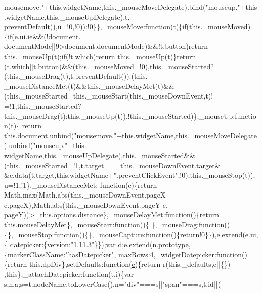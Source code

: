 \begin{DoxyCode}
{      mousemove."}+this.widgetName,this.\_mouseMoveDelegate).bind(\textcolor{stringliteral}{"mouseup."}+this.widgetName,this.\_mouseUpDelegate),t.
      preventDefault(),u=!0,!0)):!0\}\},\_mouseMove:\textcolor{keyword}{function}(\hyperlink{jquery-2_80_83_8min_8js_aaccc9105df5383111407fd5b41255e23}{t})\{\textcolor{keywordflow}{if}(this.\_mouseMoved)\{\textcolor{keywordflow}{if}(e.ui.ie&&(!document.
      documentMode||9>document.documentMode)&&!t.button)\textcolor{keywordflow}{return} this.\_mouseUp(t);\textcolor{keywordflow}{if}(!t.which)\textcolor{keywordflow}{return} this.\_mouseUp(t)\}\textcolor{keywordflow}{return}
      (t.which||t.button)&&(this.\_mouseMoved=!0),this.\_mouseStarted?(this.\_mouseDrag(t),t.preventDefault()):(this.
      \_mouseDistanceMet(t)&&this.\_mouseDelayMet(t)&&(this.\_mouseStarted=this.\_mouseStart(this.\_mouseDownEvent,t)!=
      =!1,this.\_mouseStarted?this.\_mouseDrag(t):this.\_mouseUp(t)),!this.\_mouseStarted)\},\_mouseUp:function(t)\{\textcolor{keywordflow}{
      return} this.document.unbind(\textcolor{stringliteral}{"mousemove."}+this.widgetName,this.\_mouseMoveDelegate).unbind(\textcolor{stringliteral}{"mouseup."}+this.
      widgetName,this.\_mouseUpDelegate),this.\_mouseStarted&&(this.\_mouseStarted=!1,t.target===this.\_mouseDownEvent.target&
      &e.data(t.target,\textcolor{keyword}{this}.widgetName+\textcolor{stringliteral}{".preventClickEvent"},!0),this.\_mouseStop(t)),u=!1,!1\},\_mouseDistanceMet:\textcolor{keyword}{
      function}(e)\{\textcolor{keywordflow}{return} Math.max(Math.abs(\textcolor{keyword}{this}.\_mouseDownEvent.pageX-e.pageX),Math.abs(this.\_mouseDownEvent.pageY-e.
      pageY))>=this.options.distance\},\_mouseDelayMet:\textcolor{keyword}{function}()\{\textcolor{keywordflow}{return} this.mouseDelayMet\},\_mouseStart:\textcolor{keyword}{function}()\{
      \},\_mouseDrag:\textcolor{keyword}{function}()\{\},\_mouseStop:\textcolor{keyword}{function}()\{\},\_mouseCapture:\textcolor{keyword}{function}()\{\textcolor{keywordflow}{return}!0\}\}),e.extend(e.ui,\{
      \hyperlink{date_picker-past_8js_afe491f8c157538f849b1eb001c6477d7}{datepicker}:\{version:\textcolor{stringliteral}{"1.11.3"}\}\});var d;e.extend(n.prototype,\{markerClassName:\textcolor{stringliteral}{"hasDatepicker"},
      maxRows:4,\_widgetDatepicker:\textcolor{keyword}{function}()\{\textcolor{keywordflow}{return} \textcolor{keyword}{this}.dpDiv\},setDefaults:\textcolor{keyword}{function}(\hyperlink{jquery-ui_8min_8js_a2c038346d47955cbe2cb91e338edd7e1}{e})\{\textcolor{keywordflow}{return} r(this.\_defaults,e||\{\})
      ,\textcolor{keyword}{this}\},\_attachDatepicker:\textcolor{keyword}{function}(t,i)\{var s,n,a;s=t.nodeName.toLowerCase(),n=\textcolor{stringliteral}{"div"}===s||\textcolor{stringliteral}{"span"}===s,t.id||(

\end{DoxyCode}
